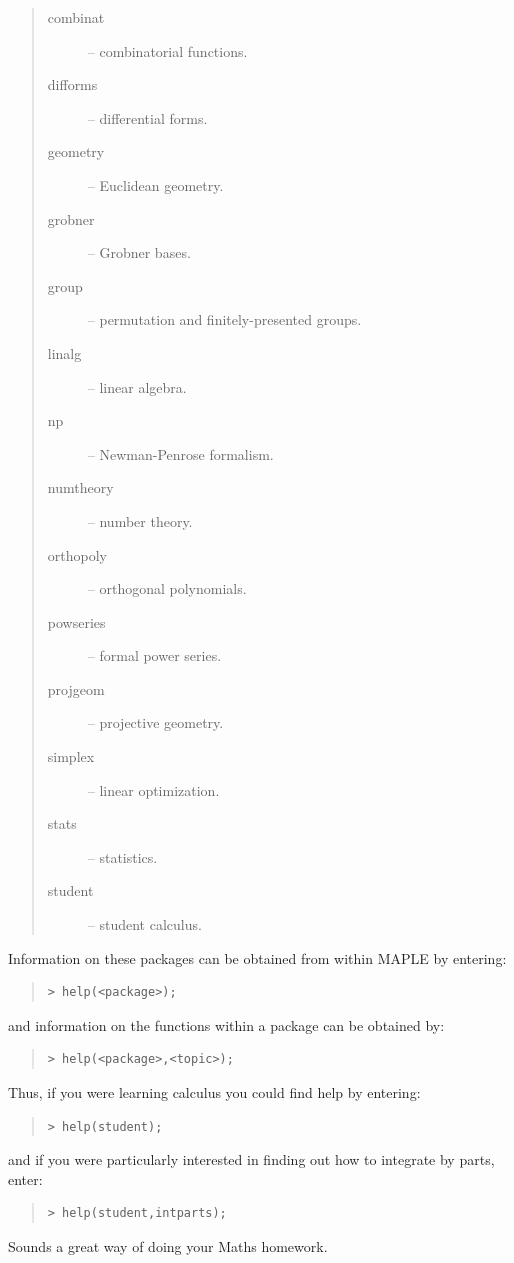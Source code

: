 \documentclass[twoside,11pt]{article}
\begin{document}
\begin{quote}
\begin{description}

\item [combinat] -- combinatorial functions.
\item [difforms] -- differential forms.
\item [geometry] -- Euclidean geometry.
\item [grobner] -- Grobner bases.
\item [group] -- permutation and finitely-presented groups.
\item [linalg] -- linear algebra.
\item [np] -- Newman-Penrose formalism.
\item [numtheory] -- number theory.
\item [orthopoly] -- orthogonal polynomials.
\item [powseries] -- formal power series.
\item [projgeom] -- projective geometry.
\item [simplex] -- linear optimization.
\item [stats] -- statistics.
\item [student] -- student calculus.

\end{description}
\end{quote}

Information on these packages can be obtained from within MAPLE by
entering:

\begin{quote}\begin{verbatim}
> help(<package>);
\end{verbatim}\end{quote}

and information on the functions within a package can be obtained by:

\begin{quote}\begin{verbatim}
> help(<package>,<topic>);
\end{verbatim}\end{quote}

Thus, if you were learning calculus you could find help by entering:

\begin{quote}\begin{verbatim}
> help(student);
\end{verbatim}\end{quote}

and if you were particularly interested in finding out how to integrate
by parts, enter:

\begin{quote}\begin{verbatim}
> help(student,intparts);
\end{verbatim}\end{quote}

Sounds a great way of doing your Maths homework.

\end{document}
